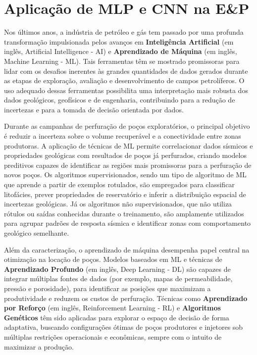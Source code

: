 
\chapter{Aplicação de MLP e CNN na E\&P}

Nos últimos anos, a indústria de petróleo e gás tem passado por uma profunda transformação impulsionada pelos avanços em \textbf{Inteligência Artificial} (em inglês, Artificial Intelligence - AI) e \textbf{Aprendizado de Máquina} (em inglês, Machine Learning - ML). Tais ferramentas têm se mostrado promissoras para lidar com os desafios inerentes às grandes quantidades de dados gerados durante as etapas de exploração, avaliação e desenvolvimento de campos petrolíferos. O uso adequado dessas ferramentas possibilita uma interpretação mais robusta dos dados geológicos, geofísicos e de engenharia, contribuindo para a redução de incertezas e para a tomada de decisão orientada por dados.

Durante as campanhas de perfuração de poços exploratórios, o principal objetivo é reduzir a incerteza sobre o volume recuperável e a conectividade entre zonas produtoras. A aplicação de técnicas de ML permite correlacionar dados sísmicos e propriedades geológicas com resultados de poços já perfurados, criando modelos preditivos capazes de identificar as regiões mais promissoras para a perfuração de novos poços. Os algoritmos supervisionados, sendo um tipo de algoritmo de ML que aprende a partir de exemplos rotulados, são empregados para classificar litofácies, prever propriedades de reservatório e inferir a distribuição espacial de incertezas geológicas. Já os algoritmos não supervisionados, que não utiliza rótulos ou saídas conhecidas durante o treinamento, são amplamente utilizados para agrupar padrões de resposta sísmica e identificar zonas com comportamento geológico semelhante. 

Além da caracterização, o aprendizado de máquina desempenha papel central na otimização na locação de poços. Modelos baseados em ML e técnicas de \textbf{Aprendizado Profundo} (em inglês, Deep Learning - DL) são capazes de integrar múltiplas fontes de dados (por exemplo, mapas de permeabilidade, pressão e porosidade), para identificar as posições que maximizam a produtividade e reduzem os custos de perfuração. Técnicas como \textbf{Aprendizado por Reforço} (em inglês, Reinforcement Learning - RL) e \textbf{Algoritmos Genéticos} têm sido aplicadas para explorar o espaço de decisão de forma adaptativa, buscando configurações ótimas de poços produtores e injetores sob múltiplas restrições operacionais e econômicas, sempre com o intuito de maximizar a produção.

